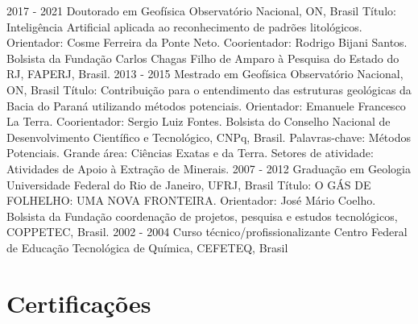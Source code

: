 \documentclass[letterpaper]{twentyonesecondcv} %
\begin{document}
{\begin{twenty}
    \twentyitem
        {2017 - 2021}
        {Doutorado em Geofísica}
        {Observatório Nacional, ON, Brasil}
        {Título: Inteligência Artificial aplicada ao reconhecimento de padrões litológicos. Orientador: Cosme Ferreira da Ponte Neto. Coorientador: Rodrigo Bijani Santos. Bolsista da Fundação Carlos Chagas Filho de Amparo à Pesquisa do Estado do RJ, FAPERJ, Brasil.}
    \twentyitem
        {2013 - 2015}
        {Mestrado em Geofísica}
        {Observatório Nacional, ON, Brasil}
        {Título: Contribuição para o entendimento das estruturas geológicas da Bacia do Paraná utilizando métodos potenciais. Orientador: Emanuele Francesco La Terra. Coorientador: Sergio Luiz Fontes. Bolsista do Conselho Nacional de Desenvolvimento Científico e Tecnológico, CNPq, Brasil. Palavras-chave: Métodos Potenciais. Grande área: Ciências Exatas e da Terra. Setores de atividade: Atividades de Apoio à Extração de Minerais.}
    \twentyitem
        {2007 - 2012}
        {Graduação em Geologia}
        {Universidade Federal do Rio de Janeiro, UFRJ, Brasil}
        {Título: O GÁS DE FOLHELHO: UMA NOVA FRONTEIRA. Orientador: José Mário Coelho. Bolsista da Fundação coordenação de projetos, pesquisa e estudos tecnológicos, COPPETEC, Brasil.}
    \twentyitem
        {2002 - 2004}
        {Curso técnico/profissionalizante}
        {Centro Federal de Educação Tecnológica de Química, CEFETEQ, Brasil}
        {} %
\end{twenty}

    \section{Certificações}
    
    \begin{twentymid} %
    \end{twentymid}
    
}
\end{document}
